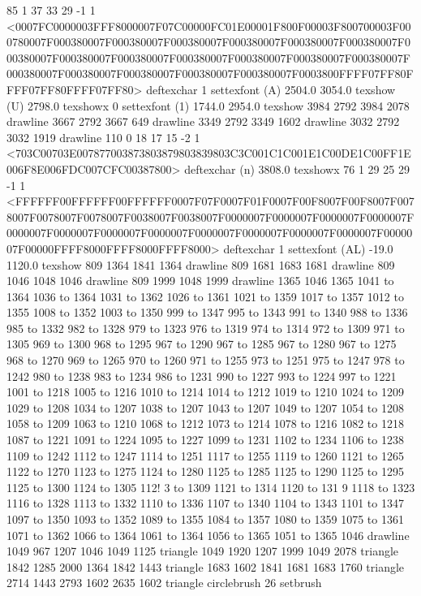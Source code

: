 85 1 37 33 29 -1 1 {{<0007FC0000003FFF8000007F07C00000FC01E00001F800F00003F800700003F000780007F000380007F000380007F000380007F000380007F000380007F000380007F000380007F000380007F000380007F000380007F000380007F000380007F000380007F000380007F000380007F000380007F000380007F000380007F0003800FFFF07FF80FFFF07FF80FFFF07FF80>}} deftexchar
1 settexfont
(A) 2504.0 3054.0 texshow
(U) 2798.0 texshowx
0 settexfont
(1) 1744.0 2954.0 texshow
3984 2792 3984 2078 drawline
3667 2792 3667 649 drawline
3349 2792 3349 1602 drawline
3032 2792 3032 1919 drawline
110 0 18 17 15 -2 1 {{<703C00703E007877003873803879803839803C3C001C1C001E1C00DE1C00FF1E006F8E006FDC007CFC00387800>}} deftexchar
(n) 3808.0 texshowx
76 1 29 25 29 -1 1 {{<FFFFFF00FFFFFF00FFFFFF0007F07F0007F01F0007F00F8007F00F8007F0078007F0078007F0078007F0038007F0038007F0000007F0000007F0000007F0000007F0000007F0000007F0000007F0000007F0000007F0000007F0000007F0000007F0000007F00000FFFF8000FFFF8000FFFF8000>}} deftexchar
1 settexfont
(AL) -19.0 1120.0 texshow
809 1364 1841 1364 drawline
809 1681 1683 1681 drawline
809 1046 1048 1046 drawline
809 1999 1048 1999 drawline
1365 1046 1365 1041 to 1364 1036 to 1364 1031 to 1362 1026 to 1361 1021 to 1359 1017 to 1357 1012 to 1355 1008 to 1352 1003 to 1350 999 to 1347 995 to 1343 991 to 1340 988 to 1336 985 to 1332 982 to 1328 979 to 1323 976 to 1319 974 to 1314 972 to 1309 971 to 1305 969 to 1300 968 to 1295 967 to 1290 967 to 1285 967 to 1280 967 to 1275 968 to 1270 969 to 1265 970 to 1260 971 to 1255 973 to 1251 975 to 1247 978 to 1242 980 to 1238 983 to 1234 986 to 1231 990 to 1227 993 to 1224 997 to 1221 1001 to 1218 1005 to 1216 1010 to 1214 1014 to 1212 1019 to 1210 1024 to 1209 1029 to 1208 1034 to 1207 1038 to 1207 1043 to 1207 1049 to 1207 1054 to 1208 1058 to 1209 1063 to 1210 1068 to 1212 1073 to 1214 1078 to 1216 1082 to 1218 1087 to 1221 1091 to 1224 1095 to 1227 1099 to 1231 1102 to 1234 1106 to 1238 1109 to 1242 1112 to 1247 1114 to 1251 1117 to 1255 1119 to 1260 1121 to 1265 1122 to 1270 1123 to 1275 1124 to 1280 1125 to 1285 1125 to 1290 1125 to 1295 1125 to 1300 1124 to 1305 112!
3 to 1309 1121 to 1314 1120 to 131
9 1118 to 1323 1116 to 1328 1113 to 1332 1110 to 1336 1107 to 1340 1104 to 1343 1101 to 1347 1097 to 1350 1093 to 1352 1089 to 1355 1084 to 1357 1080 to 1359 1075 to 1361 1071 to 1362 1066 to 1364 1061 to 1364 1056 to 1365 1051 to 1365 1046 drawline
1049 967 1207 1046 1049 1125 triangle
1049 1920 1207 1999 1049 2078 triangle
1842 1285 2000 1364 1842 1443 triangle
1683 1602 1841 1681 1683 1760 triangle
2714 1443 2793 1602 2635 1602 triangle
circlebrush 26 setbrush
